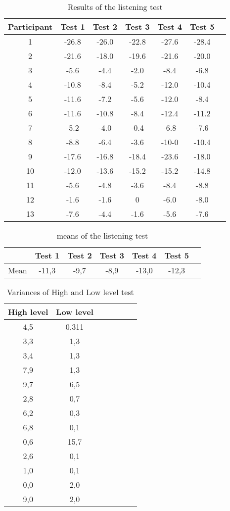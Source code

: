 \begin{table}[H]
	\centering
	\begin{tabular}{*{7}{c}}
		\hline
		Participant & Test 1 & Test 2 & Test 3  & Test 4  & Test 5  
		\\
		\hline
		1 & -26.8 & -26.0 &	-22.8 & -27.6 & -28.4 \\
		2 & -21.6 & -18.0 & -19.6  & -21.6  & -20.0 \\
		3 & -5.6 & -4.4 & -2.0 & -8.4 & -6.8  \\
		4 & -10.8 & -8.4 & -5.2 & -12.0 & -10.4 \\
		5 & -11.6 & -7.2 & -5.6	 & -12.0 & -8.4 \\
		6 & -11.6 & -10.8 & -8.4 & -12.4 & -11.2 \\
		7 & -5.2 & -4.0 & -0.4 & -6.8 & -7.6 \\
		8 & -8.8 & -6.4 & -3.6 & -10-0 & -10.4 \\
		9 & -17.6 & -16.8 & -18.4 & -23.6 & -18.0 \\
		10 & -12.0 & -13.6 & -15.2 & -15.2 & 	-14.8 \\
		11 & -5.6 & -4.8 & -3.6 & -8.4 & -8.8 \\
		12 & -1.6 & -1.6 & 0	 & -6.0 & 	-8.0 \\
		13 & -7.6 & -4.4 & -1.6	 & -5.6 & 	-7.6   \\
		\hline
	\end{tabular}
	\caption{Results of the listening test}
	\label{tab:ListeningResults}
\end{table}

\begin{table}[H]
	\centering
	\begin{tabular}{*{7}{c}}
		\hline
		& Test 1 & Test 2 & Test 3  & Test 4  & Test 5  
		\\
		\hline
		Mean & -11,3 & -9,7 & -8,9	 & -13,0 & -12,3 \\
		\hline
	\end{tabular}
	\caption{means of the listening test}
	\label{tab:MeanListeningResults}
\end{table}

\begin{table}[H]
	\centering
	\begin{tabular}{*{7}{c}}
		\hline
		High level  & Low level 
		\\
		\hline
		4,5	& 0,311 \\
		3,3	& 1,3 \\
		3,4	& 1,3 \\
		7,9	& 1,3 \\
		9,7	& 6,5 \\
		2,8	& 0,7 \\
		6,2	& 0,3 \\
		6,8	& 0,1 \\
		0,6	& 15,7 \\
		2,6	& 0,1 \\
		1,0	& 0,1 \\
		0,0	& 2,0 \\
		9,0	& 2,0 \\
		\hline
	\end{tabular}
	\caption{Variances of High and Low level test}
	\label{tab:VarListeningResults}
\end{table}



